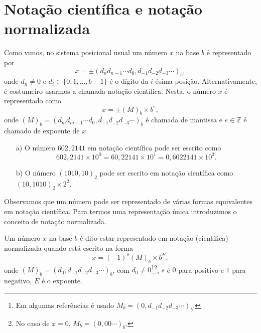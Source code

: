 \section{Notação científica e notação normalizada}

Como vimos, no sistema posicional usual um número $x$ na base $b$ é representado por
\begin{equation}
  x = \pm (d_{n}d_{n-1}\cdots d_{0},d_{-1}d_{-2}d_{-3}\cdots)_b,
\end{equation}
onde $d_{n}\neq 0$ e $d_i\in\{0, 1, \dotsc, b-1\}$ é o dígito da $i$-ésima posição. Alternativamente, é costumeiro usarmos a chamada notação científica. Nesta, o número $x$ é representado como
\begin{equation}
  x = \pm (M)_b\times b^e,
\end{equation}
onde $(M)_b = (d_{m}d_{m-1}\cdots d_{0},d_{-1}d_{-2}d_{-3}\cdots)_b$ é chamada de mantissa e $e\in\mathbb{Z}$ é chamado de expoente de $x$.

\begin{ex}
  \begin{itemize}
  \item[a)] O número $602,2141$ em notação científica pode ser escrito como
    \begin{equation}
      602,2141\times 10^0 = 60,22141\times 10^{1} = 0,6022141\times 10^{3}.
    \end{equation}
  \item[b)] O número $(1010,10)_2$ pode ser escrito em notação científica como $(10,1010)_2\times 2^2$.
  \end{itemize}
\end{ex}

Observamos que um número pode ser representado de várias formas equivalentes em notação científica. Para termos uma representação única introduzimos o conceito de notação normalizada.

\begin{defn}
  Um número $x$ na base $b$ é dito estar representado em notação (científica) normalizada quando está escrito na forma
  \begin{equation}
    x=(-1)^{s}(M)_b \times b^{E},
  \end{equation}
onde $(M)_b = (d_0,d_{-1}d_{-2}d_{-3}\cdots)_b$, com $d_{0}\neq 0$\footnote{Em algumas referências é usado $M_b = (0,d_{-1}d_{-2}d_{-3}\cdots)_b$.}\footnote{No caso de $x=0$, $M_b = (0,00\cdots)_b$.}, $s$ é $0$ para positivo e $1$ para negativo, $E$ é o expoente.
 \end{defn}

